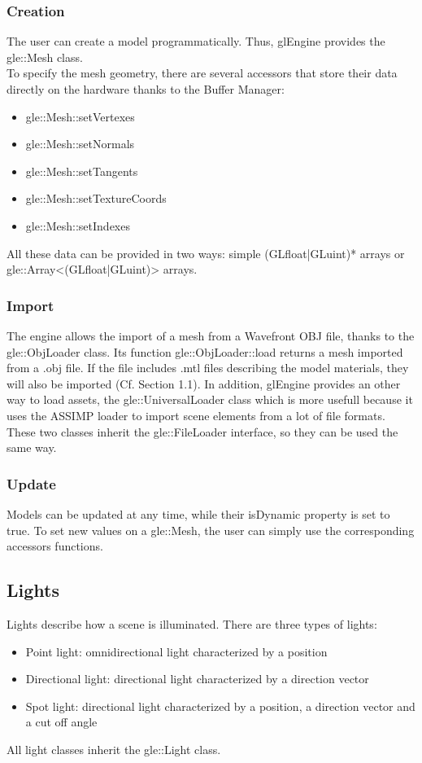 \documentclass [a4 paper,11pt]{report}
\begin{document}
\subsubsection{Creation}
The user can create a model programmatically. Thus, glEngine provides the gle::Mesh class.\\
To specify the mesh geometry, there are several accessors that store their data directly on the hardware thanks to the Buffer Manager:
\begin{itemize}
\item gle::Mesh::setVertexes
\item gle::Mesh::setNormals
\item gle::Mesh::setTangents
\item gle::Mesh::setTextureCoords
\item gle::Mesh::setIndexes
\end{itemize}
All these data can be provided in two ways: simple (GLfloat|GLuint)* arrays or gle::Array<(GLfloat|GLuint)> arrays.

\subsubsection{Import}
The engine allows the import of a mesh from a Wavefront OBJ file, thanks to the gle::ObjLoader class. Its function gle::ObjLoader::load returns a mesh imported from a .obj file. If the file includes .mtl files describing the model materials, they will also be imported (Cf. Section 1.1).
In addition, glEngine provides an other way to load assets, the gle::UniversalLoader class which is more usefull because it uses the ASSIMP loader to import scene elements from a lot of file formats. These two classes inherit the gle::FileLoader interface, so they can be used the same way.
\subsubsection{Update}
Models can be updated at any time, while their isDynamic property is set to true. To set new values on a gle::Mesh, the user can simply use the corresponding accessors functions.

\subsection{Lights}
Lights describe how a scene is illuminated. There are three types of lights:
\begin{itemize}
\item Point light: omnidirectional light characterized by a position 
\item Directional light: directional light characterized by a direction vector
\item Spot light: directional light characterized by a position, a direction vector and a cut off angle
\end{itemize}
All light classes inherit the gle::Light class.
\end{document}
